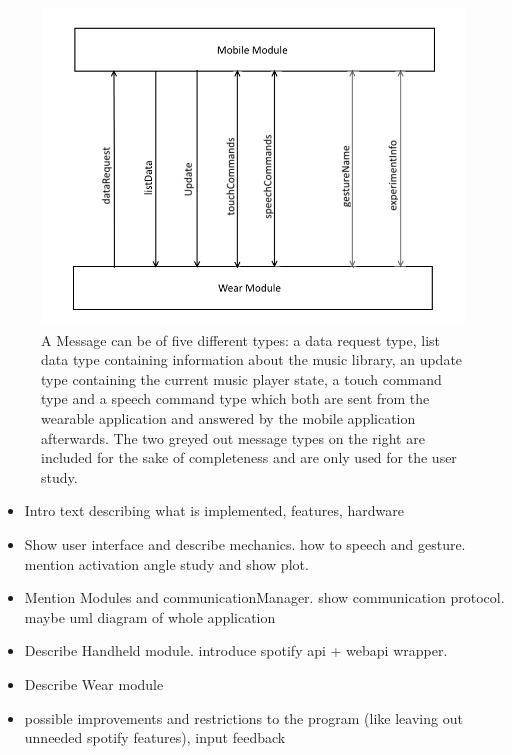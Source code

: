 \begin{figure}[bth]
	\myfloatalign
	\includegraphics[width=.99\linewidth]{img/CommunicationOverview.png}
	\caption{A Message can be of five different types: a data request type, list data type containing information about the music library, an update type containing the current music player state, a touch command type and a speech command type which both are sent from the wearable application and answered by the mobile application afterwards. The two greyed out message types on the right are included for the sake of completeness and are only used for the user study.}
	\label{fig:communicationoverview}
\end{figure}




\begin{itemize}

\item{
	Intro text describing what is implemented, features, hardware
}
\item{
	Show user interface and describe mechanics. how to speech and gesture. mention activation angle study and show plot. 
}
\item{
	Mention Modules and communicationManager. show communication protocol. maybe uml diagram of whole application
}
\item{
	Describe Handheld module. introduce spotify api + webapi wrapper.
}
\item{
	Describe Wear module
}
\item{
	possible improvements and restrictions to the program (like leaving out unneeded spotify features), input feedback
}

\end{itemize}







